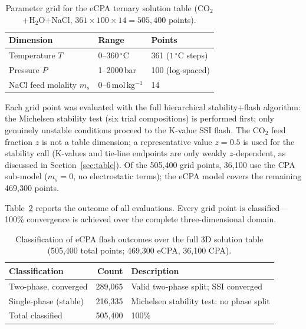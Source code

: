 \documentclass[preprint,12pt,authoryear]{elsarticle}
\begin{document}
\begin{table}[H]
  \centering
  \caption{Parameter grid for the eCPA ternary solution table
           (CO$_2$+H$_2$O+NaCl, $361\times100\times14 = 505{,}400$ points).}
  \label{tab:ecpa_scan_grid}
  \begin{tabular}{lll}
    \toprule
    Dimension & Range & Points \\
    \midrule
    Temperature $T$ & $0$--$360\,^\circ$C & 361 ($1\,^\circ$C steps) \\
    Pressure $P$ & 1--2000\,bar & 100 (log-spaced) \\
    NaCl feed molality $m_s$ & 0--6\,mol\,kg$^{-1}$ & 14 \\
    \bottomrule
  \end{tabular}
\end{table}

Each grid point was evaluated with the full hierarchical stability+flash algorithm: the Michelsen
stability test (six trial compositions) is performed first; only genuinely unstable
conditions proceed to the K-value SSI flash.
The CO$_2$ feed fraction $z$ is not a table dimension; a representative value
$z = 0.5$ is used for the stability call (K-values and tie-line endpoints are
only weakly $z$-dependent, as discussed in Section~\ref{sec:table}).
Of the 505{,}400 grid points, 36{,}100 use the CPA sub-model ($m_s = 0$, no
electrostatic terms); the eCPA model covers the remaining 469{,}300 points.

Table~\ref{tab:ecpa_scan_convergence} reports the outcome of all evaluations.
Every grid point is classified---100\% convergence is achieved over the
complete three-dimensional domain.

\begin{table}[H]
  \centering
  \caption{Classification of eCPA flash outcomes over the full 3D solution table
           (505{,}400 total points; 469{,}300 eCPA, 36{,}100 CPA).}
  \label{tab:ecpa_scan_convergence}
  \begin{tabular}{lrl}
    \toprule
    Classification & Count & Description \\
    \midrule
    Two-phase, converged          & 289{,}065 & Valid two-phase split; SSI converged \\
    Single-phase (stable)         & 216{,}335 & Michelsen stability test: no phase split \\
    \midrule
    Total classified              & 505{,}400 & 100\% \\
    \bottomrule
  \end{tabular}
\end{table}
\end{document}
